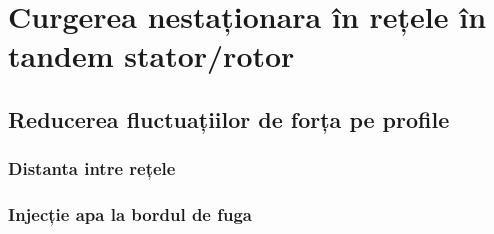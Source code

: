 \chapter{Curgerea nestaționara în rețele în tandem stator/rotor}\label{chapter:curgerea}

\section{Reducerea fluctuațiilor de forța pe profile}

\subsection{Distanta intre rețele}

\subsection{Injecție apa la bordul de fuga}